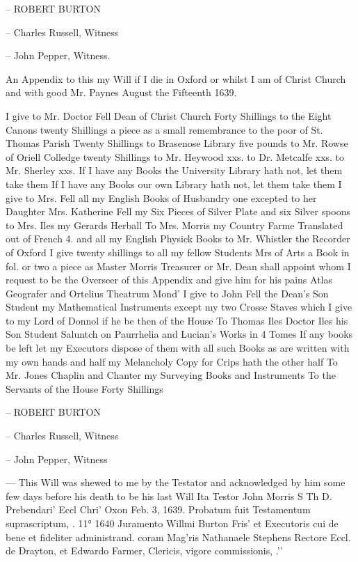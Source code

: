 {-- ROBERT BURTON

-- Charles Russell, Witness

-- John Pepper, Witness.

An Appendix to this my Will if I die in Oxford or whilst I am of Christ Church and with good Mr. Paynes August the Fifteenth 1639.

I give to Mr. Doctor Fell Dean of Christ Church Forty Shillings to the Eight Canons twenty Shillings a piece as a small remembrance to the poor of St. Thomas Parish Twenty Shillings to Brasenose Library five pounds to Mr. Rowse of Oriell Colledge twenty Shillings to Mr. Heywood xxs. to Dr. Metcalfe xxs. to Mr. Sherley xxs. If I have any Books the University Library hath not, let them take them If I have any Books our own Library hath not, let them take them I give to Mrs. Fell all my English Books of Husbandry one excepted to her Daughter Mrs. Katherine Fell my Six Pieces of Silver Plate and six Silver spoons to Mrs. Iles my Gerards Herball To Mrs. Morris my Country Farme Translated out of French 4. and all my English Physick Books to Mr. Whistler the Recorder of Oxford I give twenty shillings to all my fellow Students Mrs of Arts a Book in fol. or two a piece as Master Morris Treasurer or Mr. Dean shall appoint whom I request to be the Overseer of this Appendix and give him for his pains Atlas Geografer and Ortelius Theatrum Mond' I give to John Fell the Dean's Son Student my Mathematical Instruments except my two Crosse Staves which I give to my Lord of Donnol if he be then of the House To Thomas Iles Doctor Iles his Son Student Saluntch on Paurrhelia and Lucian's Works in 4 Tomes If any books be left let my Executors dispose of them with all such Books as are written with my own hands and half my Melancholy Copy for Crips hath the other half To Mr. Jones Chaplin and Chanter my Surveying Books and Instruments To the Servants of the House Forty Shillings

-- ROBERT BURTON

-- Charles Russell, Witness

-- John Pepper, Witness

--- This Will was shewed to me by the Testator and acknowledged by him some few days before his death to be his last Will Ita Testor John Morris S Th D. Prebendari' Eccl Chri' Oxon Feb. 3, 1639. Probatum fuit Testamentum suprascriptum, \etc. 11° 1640 Juramento Willmi Burton Fris' et Executoris cui \etc{} de bene et fideliter administrand. \etc{} coram Mag'ris Nathanaele Stephens Rectore Eccl. de Drayton, et Edwardo Farmer, Clericis, vigore commissionis, \etc.\rq\rq}
